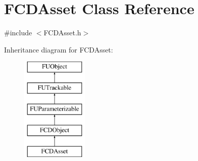 \hypertarget{classFCDAsset}{
\section{FCDAsset Class Reference}
\label{classFCDAsset}
}


{\ttfamily \#include $<$FCDAsset.h$>$}

Inheritance diagram for FCDAsset:\begin{figure}[H]
\begin{center}
\leavevmode
\includegraphics[height=5.000000cm]{classFCDAsset}
\end{center}
\end{figure}
